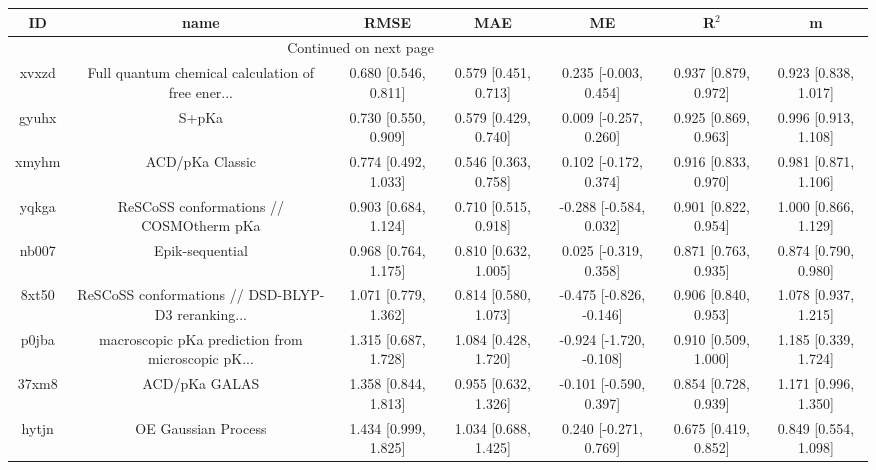 \documentclass{article}
\begin{document}
\begin{center}
\begin{longtable}{|ccccccc|}
\toprule
    ID &                                               name &                  RMSE &                   MAE &                       ME &                 R$^2$ &                      m \\
\midrule
\endhead
\midrule
\multicolumn{3}{r}{{Continued on next page}} \\
\midrule
\endfoot

\bottomrule
\endlastfoot
 xvxzd &  Full quantum chemical calculation of free ener... &  0.680 [0.546, 0.811] &  0.579 [0.451, 0.713] &    0.235 [-0.003, 0.454] &  0.937 [0.879, 0.972] &   0.923 [0.838, 1.017] \\
 gyuhx &                                              S+pKa &  0.730 [0.550, 0.909] &  0.579 [0.429, 0.740] &    0.009 [-0.257, 0.260] &  0.925 [0.869, 0.963] &   0.996 [0.913, 1.108] \\
 xmyhm &                                    ACD/pKa Classic &  0.774 [0.492, 1.033] &  0.546 [0.363, 0.758] &    0.102 [-0.172, 0.374] &  0.916 [0.833, 0.970] &   0.981 [0.871, 1.106] \\
 yqkga &            ReSCoSS conformations // COSMOtherm pKa &  0.903 [0.684, 1.124] &  0.710 [0.515, 0.918] &   -0.288 [-0.584, 0.032] &  0.901 [0.822, 0.954] &   1.000 [0.866, 1.129] \\
 nb007 &                                    Epik-sequential &  0.968 [0.764, 1.175] &  0.810 [0.632, 1.005] &    0.025 [-0.319, 0.358] &  0.871 [0.763, 0.935] &   0.874 [0.790, 0.980] \\
 8xt50 &  ReSCoSS conformations // DSD-BLYP-D3 reranking... &  1.071 [0.779, 1.362] &  0.814 [0.580, 1.073] &  -0.475 [-0.826, -0.146] &  0.906 [0.840, 0.953] &   1.078 [0.937, 1.215] \\
 p0jba &  macroscopic pKa prediction from microscopic pK... &  1.315 [0.687, 1.728] &  1.084 [0.428, 1.720] &  -0.924 [-1.720, -0.108] &  0.910 [0.509, 1.000] &   1.185 [0.339, 1.724] \\
 37xm8 &                                      ACD/pKa GALAS &  1.358 [0.844, 1.813] &  0.955 [0.632, 1.326] &   -0.101 [-0.590, 0.397] &  0.854 [0.728, 0.939] &   1.171 [0.996, 1.350] \\
 hytjn &                                OE Gaussian Process &  1.434 [0.999, 1.825] &  1.034 [0.688, 1.425] &    0.240 [-0.271, 0.769] &  0.675 [0.419, 0.852] &   0.849 [0.554, 1.098] \\

\end{longtable}
\end{center}
\end{document}
